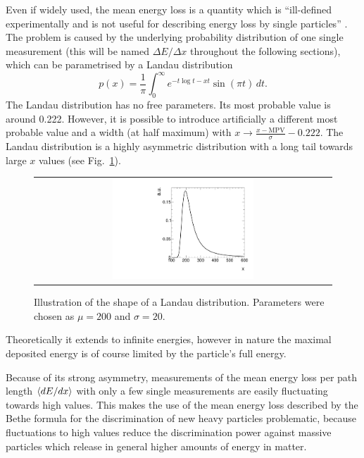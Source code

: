 Even if widely used, the mean energy loss is a quantity which is ``ill-defined experimentally and is not useful for describing energy loss by single particles'' \cite{bib:PDG_2014}.
The problem is caused by the underlying probability distribution of one single \dedx measurement (this will be named $\Delta E/ \Delta x $ throughout the following sections), which can be parametrised by a Landau distribution \cite{bib:Landau_1944}
\begin{equation}
p(x) = \frac{1}{\pi} \int_0^\infty\! e^{-t \log t - x t} \sin(\pi t)\, dt.
\end{equation}
The Landau distribution has no free parameters. Its most probable value is around 0.222.
However, it is possible to introduce artificially a different most probable value and a width (at half maximum) with $x \rightarrow \frac{x-\text{MPV}}{\sigma}-0.222$.
The Landau distribution is a highly asymmetric distribution with a long tail towards large $x$ values (see Fig.~\ref{fig:landau}).
\begin{figure}[!t]
  \centering 
  \begin{tabular}{c}
  \includegraphics[width=0.49\textwidth]{figures/analysis/PixelCalibration/Landau.pdf}
  \end{tabular}
  \caption{Illustration of the shape of a Landau distribution. Parameters were chosen as $\mu=200$ and $\sigma=20$.} 
  \label{fig:landau}
\end{figure}
Theoretically it extends to infinite energies, however in nature the maximal deposited energy is of course limited by the particle's full energy.

Because of its strong asymmetry, measurements of the mean energy loss per path length $\langle dE/dx \rangle$ with only a few single measurements are easily fluctuating towards high values.
This makes the use of the mean energy loss described by the Bethe formula for the discrimination of new heavy particles problematic, because fluctuations to high values reduce the discrimination power against massive particles which release in general higher amounts of energy in matter.


